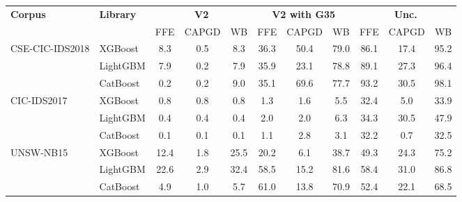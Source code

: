 \begin{tabular}{@{}llccccccccc@{}}
\toprule
\textbf{Corpus} & \textbf{Library} & \multicolumn{3}{c}{\textbf{V2}} & \multicolumn{3}{c}{\textbf{V2 with G35}} & \multicolumn{3}{c}{\textbf{Unc.}} \\
& & FFE & CAPGD & WB & FFE & CAPGD & WB & FFE & CAPGD & WB \\
\midrule
CSE-CIC-IDS2018 & XGBoost & 8.3 & 0.5 & 8.3 & 36.3 & 50.4 & 79.0 & 86.1 & 17.4 & 95.2 \\
 & LightGBM & 7.9 & 0.2 & 7.9 & 35.9 & 23.1 & 78.8 & 89.1 & 27.3 & 96.4 \\
 & CatBoost & 0.2 & 0.2 & 9.0 & 35.1 & 69.6 & 77.7 & 93.2 & 30.5 & 98.1 \\
\midrule
CIC-IDS2017 & XGBoost & 0.8 & 0.8 & 0.8 & 1.3 & 1.6 & 5.5 & 32.4 & 5.0 & 33.9 \\
 & LightGBM & 0.4 & 0.4 & 0.4 & 2.0 & 2.0 & 6.3 & 34.3 & 30.5 & 47.9 \\
 & CatBoost & 0.1 & 0.1 & 0.1 & 1.1 & 2.8 & 3.1 & 32.2 & 0.7 & 32.5 \\
\midrule
UNSW-NB15 & XGBoost & 12.4 & 1.8 & 25.5 & 20.2 & 6.1 & 38.7 & 49.3 & 24.3 & 75.2 \\
 & LightGBM & 22.6 & 2.9 & 32.4 & 58.5 & 15.2 & 81.6 & 58.4 & 31.0 & 86.8 \\
 & CatBoost & 4.9 & 1.0 & 5.7 & 61.0 & 13.8 & 70.9 & 52.4 & 22.1 & 68.5 \\
\bottomrule
\end{tabular}
